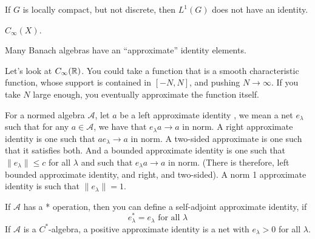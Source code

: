 \begin{proposition}
    If $G$ is locally compact, but not discrete, then $L^1(G)$ does not have an identity. 
\end{proposition}
\begin{example}
    $C_\infty(X)$.
\end{example}
\begin{note}
    Many Banach algebras have an ``approximate'' identity elements.
\end{note}
\begin{example}
    Let's look at $C_\infty(\mathbb{R})$. You could take a function that is a smooth characteristic function, whose support is contained in $[-N, N]$, and pushing $N\to\infty$. If you take $N$ large enough, you eventually approximate the function itself.
\end{example}

\begin{definition}
    For a normed algebra $\mathcal{A}$, let $a$ be a left approximate identity , we mean a net ${e_\lambda}$ such that for any $a\in\mathcal{A}$, we have that $e_\lambda a\to a$ in norm. A right approximate identity is one such that $ae_\lambda\to a$ in norm. A two-sided approximate is one such that it satisfies both. And a bounded approximate identity is one such that $\|e_\lambda\|\leq c$ for all $\lambda$ and such that $e_\lambda a\to a$ in norm. (There is therefore, left bounded approximate identity, and right, and two-sided). A norm 1 approximate identity is such that $\|e_\lambda\|=1$.
\end{definition}
If $\mathcal{A}$ has a * operation, then you can define a self-adjoint approximate identity, if
\begin{equation*}
    e_\lambda^*=e_\lambda \text{ for all } \lambda
\end{equation*}
If $\mathcal{A}$ is a $C^*$-algebra, a positive approximate identity is a net with $e_\lambda>0$ for all $\lambda$. 

